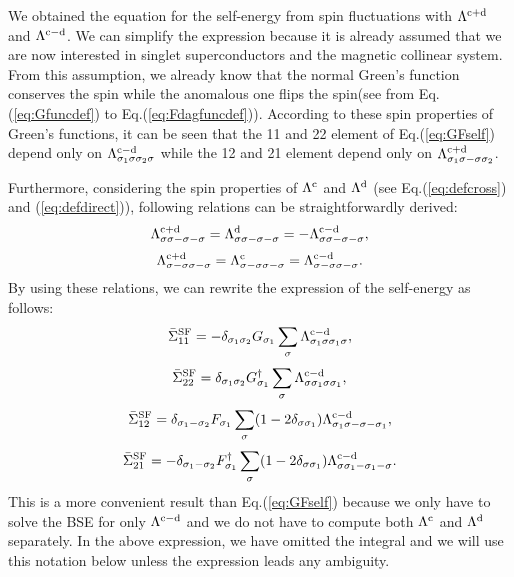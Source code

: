 We obtained the equation for the self-energy from spin fluctuations with $\Lambda^{\rm c + \rm d}$ and $\Lambda^{\rm c - \rm d}$.
We can simplify the expression because it is already assumed that we are now interested in singlet superconductors and the magnetic collinear system.
From this assumption, we already know that the normal Green's function 
conserves the spin while the anomalous one flips the spin(see from Eq.
(\ref{eq:Gfuncdef}) to Eq.(\ref{eq:Fdagfuncdef})).
According to these spin properties of Green's functions, it can be seen that
the 11 and 22 element of Eq.(\ref{eq:GFself}) depend only on $\Lambda^{\rm c - \rm d}_{\sigma_1\sigma\sigma_2\sigma}$ 
while the 12 and 21 element depend only on $\Lambda^{\rm c + \rm d}_{\sigma_1\sigma-\sigma\sigma_2}$.

Furthermore, considering the spin properties of $\Lambda^{\rm c}$ and 
$\Lambda^{\rm d}$ (see Eq.(\ref{eq:defcross}) and (\ref{eq:defdirect})),
following relations can be straightforwardly derived:
%
\begin{equation}
	\Lambda^{\rm c + \rm d}_{\sigma\sigma-\sigma-\sigma} =
	\Lambda^{\rm d}_{\sigma\sigma-\sigma-\sigma} =
	- \Lambda^{\rm c - \rm d}_{\sigma\sigma-\sigma-\sigma},
	\label{eq:lambdasimp1}
\end{equation}
%
\begin{equation}
	\Lambda^{\rm c + \rm d}_{\sigma-\sigma\sigma-\sigma} =
	\Lambda^{\rm c}_{\sigma-\sigma\sigma-\sigma} =
	\Lambda^{\rm c - \rm d}_{\sigma-\sigma\sigma-\sigma}.
	\label{eq:lambdasimp2}
\end{equation}
%
By using these relations, we can rewrite the expression of the self-energy as follows:
%
\begin{equation}
	\bar{\Sigma}^{\rm{SF}}_{11} = -\delta_{\sigma_1\sigma_2}G_{\sigma_1}
	\sum_{\sigma}\Lambda^{\rm c - \rm d}_{\sigma_1\sigma\sigma_1\sigma},
	\label{eq:Sigma11}
\end{equation}
%
\begin{equation}
	\bar{\Sigma}^{\rm{SF}}_{22} = \delta_{\sigma_1\sigma_2}G^{\dag}_{\sigma_1}
	\sum_{\sigma}\Lambda^{\rm c - \rm d}_{\sigma\sigma_1\sigma\sigma_1},
	\label{eq:Sigma22}
\end{equation}
%
\begin{equation}
	\bar{\Sigma}^{\rm{SF}}_{12} = \delta_{\sigma_1-\sigma_2}F_{\sigma_1}
	\sum_{\sigma}(1-2\delta_{\sigma\sigma_1})\Lambda^{\rm c - \rm d}_{\sigma_1\sigma-\sigma-\sigma_1},
	\label{eq:Sigma12}
\end{equation}
%
\begin{equation}
	\bar{\Sigma}^{\rm{SF}}_{21} = -\delta_{\sigma_1-\sigma_2}F^{\dag}_{\sigma_1}
	\sum_{\sigma}(1-2\delta_{\sigma\sigma_1})\Lambda^{\rm c - \rm d}_{\sigma\sigma_1-\sigma_1-\sigma}.
	\label{eq:Sigma21}
\end{equation}
%
This is a more convenient result than Eq.({\ref{eq:GFself}}) because 
we only have to solve the BSE for only $\Lambda^{\rm c - \rm d}$ and 
we do not have to compute both $\Lambda^{\rm c}$ and $\Lambda^{\rm d}$ separately.
In the above expression, we have omitted the integral and we will use this 
notation below unless the expression leads any ambiguity. 

